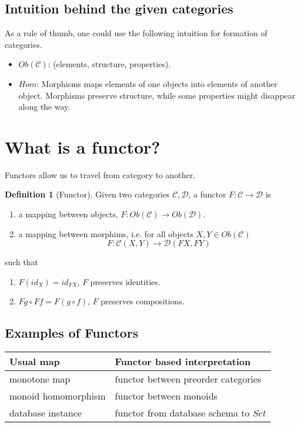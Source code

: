 \documentclass{report}
\theoremstyle{definition}
\newtheorem{definition}{Definition}
\begin{document}
\subsection*{Intuition behind the given categories}
As a rule of thumb, one could use the following intuition for formation of categories. 
\begin{itemize}
	\item $Ob(\mathcal{C})$: (elements, structure, properties). 
	\item $Hom$: Morphisms maps elements of one objects into elements of another object. Morphisms preserve structure, while some properties might disappear along the way. 
\end{itemize}

\section*{What is a functor?}
Functors allow us to travel from category to another. 
\begin{definition}[Functor]
	Given two categories $\mathcal{C}, \mathcal{D}$, a functor $F:\mathcal{C}\to\mathcal{D}$ is 
	\begin{enumerate}
		\item a mapping between objects, $F:Ob(\mathcal{C})\to Ob(\mathcal{D})$.
		\item a mapping between morphims, i.e. for all objects $X,Y\in Ob(\mathcal{C})$
		\[
		F: \mathcal{C}(X,Y) \to \mathcal{D}(FX,FY)
		\]
	\end{enumerate}	
	such that 
	\begin{enumerate}[label=(\alph*)]
		\item $F(id_X) = id_{FX}$, $F$ preserves identities.
		\item $Fg \circ Ff = F(g\circ f)$, $F$ preserves compositions.
	\end{enumerate}
\end{definition}

\subsection*{Examples of Functors}
\begin{center}
	\begin{tabular}{|l|l|}
		\hline
		Usual map & Functor based interpretation\\
		\hline
		monotone map & functor between preorder categories\\
		monoid homomorphism & functor between monoids\\
		database instance & functor from database schema to $Set$\\
		\hline
	\end{tabular}
\end{center}
\end{document}
